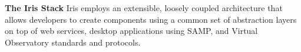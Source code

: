 \textbf{\label{fig:stack} The Iris Stack} Iris employs an extensible, loosely coupled architecture that allows developers to create components using a common set of abstraction layers on top of web services, desktop applications using SAMP, and Virtual Observatory standards and protocols.